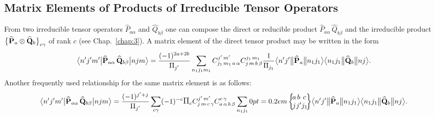 \subsection{Matrix Elements of Products of Irreducible Tensor Operators}\label{sec:13.1.3}
From two irreducible tensor operators \(\widehat{P}_{a \alpha}\) and \(\widehat{Q}_{b \beta}\) one can compose the direct or reducible product \(\widehat{P}_{a \alpha}\, \widehat{Q}_{b \beta}\) and the irreducible product \(\bigl\{\widehat{\mathbf{P}}_{a} \otimes \widehat{\mathbf{Q}}_{b}\bigr\}_{c \gamma}\) of rank \(c\) (see Chap.~\ref{chap:3}). A matrix element of the direct tensor product may be written in the form
\begin{equation}
\braOket{n^{\prime} j^{\prime} m^{\prime}}{\widehat{\mathbf{P}}_{a \alpha} \, \widehat{\mathbf{Q}}_{b \beta}}{n j m}=\frac{(-1)^{2 a+2 b}}{\Fact{j^{\prime}}} \sum_{n_{1} j_{1} m_{1}} 
\clebsch{j_{1}}{m_{1}}{a}{\alpha}{j^{\prime}}{m^{\prime}} 
\clebsch{j}{m}{b}{\beta}{j_{1}}{m_{1}} \frac{1}{\Fact{j_1}}
\braOketred{n^{\prime} j^{\prime}}{\widehat{\mathbf{P}}_{a}}{n_{1} j_{1}}
\braOketred{n_{1} j_{1}}{\widehat{\mathbf{Q}}_{b}}{n j} . \label{eq:13:1:8}
\end{equation}
Another frequently used relationship for the same matrix element is as follows:
\begin{equation}
\braOket{n^{\prime} j^{\prime} m^{\prime}}{\widehat{\mathbf{P}}_{a \alpha} \, \widehat{\mathbf{Q}}_{b \beta}}{n j m}=\frac{(-1)^{j^{\prime}+j}}{\Fact{j^{\prime}}} \sum_{c \gamma}(-1)^{-c} \Fact{c} 
\clebsch{j}{m}{c}{\gamma}{j^{\prime}}{m^{\prime}} 
\clebsch{a}{\alpha}{b}{\beta}{c}{\gamma} 
\sum_{n_{1} j_{1}}
\sixj{a}{b}{c}{j}{j^\prime}{j_1}
\braOketred{n^\prime j^{\prime}}{\widehat{\mathbf{P}}_{a}}{n_{1} j_{1}}
\braOketred{n_{1} j_{1}}{\widehat{\mathbf{Q}}_{b}}{n j} .\label{eq:13:1:9}
\end{equation}

